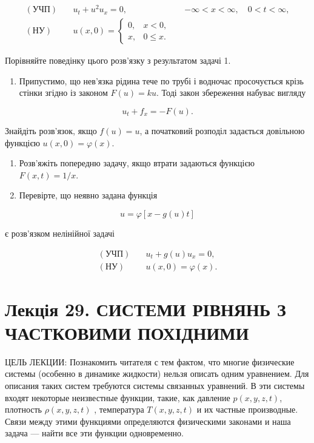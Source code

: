 \documentclass[
  ukrainian,
]{article}
\providecommand{\tightlist}{%
  \setlength{\itemsep}{0pt}\setlength{\parskip}{0pt}}
\begin{document}
\[
\begin{aligned}
(\text{УЧП})\quad & u_t + u^2 u_x = 0, && -\infty < x < \infty,\quad 0 < t < \infty, \\
(\text{НУ})\quad &
u(x,0)=
\begin{cases}
0, & x < 0,\\
x, & 0 \le x.
\end{cases}
\end{aligned}
\]

Порівняйте поведінку цього розв'язку з результатом задачі 1.

\begin{enumerate}
\def\labelenumi{\arabic{enumi}.}
\setcounter{enumi}{2}
\tightlist
\item
  Припустимо, що нев'язка рідина тече по трубі і водночас просочується
  крізь стінки згідно із законом \(F(u)=ku\). Тоді закон збереження
  набуває вигляду
\end{enumerate}

\[
u_t + f_x = -F(u).
\]

Знайдіть розв'язок, якщо \(f(u)=u\), а початковий розподіл задається
довільною функцією \(u(x,0)=\varphi(x)\).

\begin{enumerate}
\def\labelenumi{\arabic{enumi}.}
\setcounter{enumi}{3}
\item
  Розв'яжіть попередню задачу, якщо втрати задаються функцією
  \(F(x,t)=1/x\).
\item
  Перевірте, що неявно задана функція
\end{enumerate}

\[
u = \varphi[x-g(u)t]
\]

є розв'язком нелінійної задачі

\[
\begin{aligned}
(\text{УЧП})\quad & u_t + g(u)u_x = 0,\\
(\text{НУ})\quad & u(x,0)=\varphi(x).
\end{aligned}
\]

\section{Лекція 29. СИСТЕМИ РІВНЯНЬ З ЧАСТКОВИМИ
ПОХІДНИМИ}\label{ux43bux435ux43aux446ux456ux44f-29.-ux441ux438ux441ux442ux435ux43cux438-ux440ux456ux432ux43dux44fux43dux44c-ux437-ux447ux430ux441ux442ux43aux43eux432ux438ux43cux438-ux43fux43eux445ux456ux434ux43dux438ux43cux438}

ЦЕЛЬ ЛЕКЦИИ: Познакомить читателя с тем фактом, что многие физические
системы (особенно в динамике жидкости) нельзя описать одним уравнением.
Для описания таких систем требуются системы связанных уравнений. В эти
системы входят некоторые неизвестные функции, такие, как давление
\(p(x, y, z, t)\), плотность \(\rho(x, y, z, t)\) , температура
\(T(x, y, z, t)\) и их частные производные. Связи между этими функциями
определяются физическими законами и наша задача --- найти все эти
функции одновременно.
\end{document}
